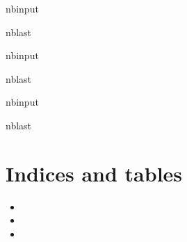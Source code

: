 \documentclass[letterpaper,10pt,english]{sphinxmanual}
\begin{document}
\begin{sphinxuseclass}{nbinput}
\begin{sphinxuseclass}{nblast}
{
\begin{sphinxVerbatim}[commandchars=\\\{\}]
\llap{\color{nbsphinxin}[ ]:\,\hspace{\fboxrule}\hspace{\fboxsep}}
\end{sphinxVerbatim}
}

\end{sphinxuseclass}
\end{sphinxuseclass}
\begin{sphinxuseclass}{nbinput}
\begin{sphinxuseclass}{nblast}
{
\begin{sphinxVerbatim}[commandchars=\\\{\}]
\llap{\color{nbsphinxin}[ ]:\,\hspace{\fboxrule}\hspace{\fboxsep}}
\end{sphinxVerbatim}
}

\end{sphinxuseclass}
\end{sphinxuseclass}
\begin{sphinxuseclass}{nbinput}
\begin{sphinxuseclass}{nblast}
{
\begin{sphinxVerbatim}[commandchars=\\\{\}]
\llap{\color{nbsphinxin}[ ]:\,\hspace{\fboxrule}\hspace{\fboxsep}}
\end{sphinxVerbatim}
}

\end{sphinxuseclass}
\end{sphinxuseclass}

\chapter{Indices and tables}
\label{\detokenize{index:indices-and-tables}}\begin{itemize}
\item {} 
\sphinxAtStartPar
{}

\item {} 
\sphinxAtStartPar
{}

\item {} 
\sphinxAtStartPar
{}

\end{itemize}
\end{document}
